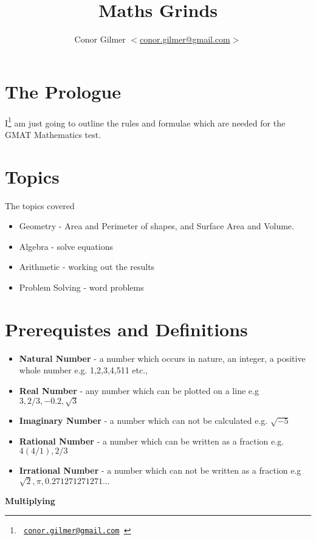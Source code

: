 \documentclass{article}
\title{\cg{} Maths Grinds}
\author{Conor Gilmer $<$\href{mailto:conor.gilmer@gmail.com}{conor.gilmer@gmail.com}$>$}
\newcommand{\email}[1]{\texttt{#1}}
\begin{document}
\pagestyle{headings}
\maketitle

\tableofcontents


\newpage
\section{The Prologue}
I\footnote{\email{ \href{mailto:conor.gilmer@gmail.com.com}{conor.gilmer@gmail.com} }} am just going to outline the rules and formulae which are needed for the GMAT Mathematics test.

\newpage
\section{Topics}

The topics covered

\begin{itemize}
\item Geometry - Area and Perimeter of shapes, and Surface Area and Volume.
\item Algebra - solve equations
\item Arithmetic - working out the results
\item Problem Solving - word problems
\end{itemize}


\newpage
\section{Prerequistes and Definitions}
\begin{itemize}
\item \textbf{Natural Number} - a number which occurs in nature, an integer, a positive whole number e.g. 1,2,3,4,511 etc.,
\item \textbf{Real Number} - any number which can be plotted on a line e.g $3, 2/3, -0.2, \sqrt{3}$
\item \textbf{Imaginary Number} - a number which can not be calculated e.g. $\sqrt{-5}$
\item \textbf{Rational Number} - a number which can be written as a fraction e.g. $4 (4/1) , 2/3$
\item \textbf{Irrational Number} - a number which can not be written as a fraction e.g $\sqrt{2}, \pi, 0.271271271271...$
\end{itemize}

\textbf{Multiplying}
\end{document}
